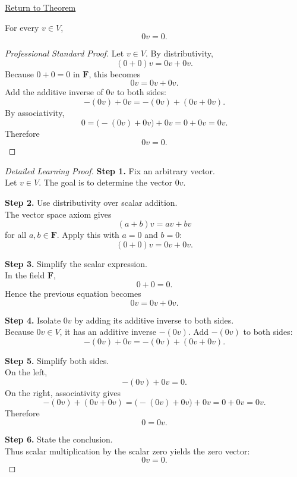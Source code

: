
\newpage
{}
\label{prf:zero-scalar-times-vector}

\begin{remark*}[Return]
\hyperref[thm:zero-scalar-times-vector]{Return to Theorem}
\end{remark*}

\begin{theorem*}[$0v=0$]
For every $v \in V$,
\[
0v=0.
\]
\end{theorem*}

\begin{proof}[Professional Standard Proof]
\LRAProofBodyStart
Let $v \in V$. By distributivity,
\[
(0+0)v=0v+0v.
\]
Because $0+0=0$ in $\mathbf{F}$, this becomes
\[
0v=0v+0v.
\]
Add the additive inverse of $0v$ to both sides:
\[
-(0v)+0v=-(0v)+(0v+0v).
\]
By associativity,
\[
0=\bigl(-(0v)+0v\bigr)+0v=0+0v=0v.
\]
Therefore
\[
0v=0.
\]
\end{proof}

\begin{proof}[Detailed Learning Proof]
\LRAProofBodyStart

\textbf{Step 1.} Fix an arbitrary vector.\\
Let $v \in V$. The goal is to determine the vector $0v$.

\textbf{Step 2.} Use distributivity over scalar addition.\\
The vector space axiom gives
\[
(a+b)v=av+bv
\]
for all $a,b \in \mathbf{F}$. Apply this with $a=0$ and $b=0$:
\[
(0+0)v=0v+0v.
\]

\textbf{Step 3.} Simplify the scalar expression.\\
In the field $\mathbf{F}$,
\[
0+0=0.
\]
Hence the previous equation becomes
\[
0v=0v+0v.
\]

\textbf{Step 4.} Isolate $0v$ by adding its additive inverse to both sides.\\
Because $0v \in V$, it has an additive inverse $-(0v)$. Add $-(0v)$ to both sides:
\[
-(0v)+0v=-(0v)+(0v+0v).
\]

\textbf{Step 5.} Simplify both sides.\\
On the left,
\[
-(0v)+0v=0.
\]
On the right, associativity gives
\[
-(0v)+(0v+0v)=\bigl(-(0v)+0v\bigr)+0v=0+0v=0v.
\]
Therefore
\[
0=0v.
\]

\textbf{Step 6.} State the conclusion.\\
Thus scalar multiplication by the scalar zero yields the zero vector:
\[
0v=0.
\]
\end{proof}

